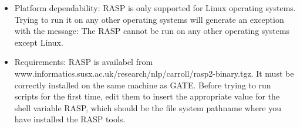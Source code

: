 \documentclass[reqno]{article}
\begin{document}
\begin{itemize}
      
\item Platform dependability:
      RASP is only supported for Linux operating systems. Trying to run it on any other operating systems will generate an
      exception with the message: The RASP cannot be run on any other operating systems except Linux.            
      \\
      
\item Requirements:
      RASP is availabel from www.informatics.susx.ac.uk/research/nlp/carroll/rasp2-binary.tgz. It must be correctly 
      installed on the same machine as GATE. Before trying to run scripts for the first time, edit them to insert the 
      appropriate value for the shell variable RASP, which should be the file system pathname where you have installed 
      the RASP tools.     
      \\
      
\end{itemize}
      
\end{document}
